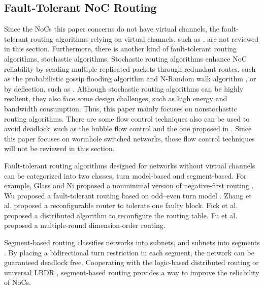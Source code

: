 \subsection{Fault-Tolerant NoC Routing}
Since the NoCs this paper concerns do not have virtual channels, the fault-tolerant routing algorithms relying on virtual channels, such as \cite{boppana1994fault}\cite{ho2004new} \cite{gomez2006routing} \cite{xiang2008practical}, are not reviewed in this section. Furthermore, there is another kind of fault-tolerant routing algorithms, stochastic algorithms. Stochastic routing algorithms enhance NoC reliability by sending multiple replicated packets through redundant routes, such as the probabilistic gossip flooding algorithm \cite{dumitras2003chip} and N-Random walk algorithm \cite{pirretti2004fault}, or by deflection, such as \cite{moscibroda2009case} \cite{tsai2012scalable}. Although stochastic routing algorithms can be highly resilient, they also face some design challenges, such as high energy and bandwidth consumption. Thus, this paper mainly focuses on nonstochastic routing algorithms. There are some flow control techniques also can be used to avoid deadlock, such as the bubble flow control \cite{puente2001adaptive} and the one proposed in \cite{xiang2011efficient}. Since this paper focuses on wormhole switched networks, those flow control techniques will not be reviewed in this section.

Fault-tolerant routing algorithms designed for networks without virtual channels can be categorized into two classes, turn model-based and segment-based. For example, Glass and Ni \cite{glass1993fault} proposed a nonminimal version of negative-first routing \cite{glass1992turn}. Wu proposed a fault-tolerant routing based on odd–even turn model \cite{wu2003fault}. Zhang et al. \cite{zhang2008reconfigurable} proposed a reconfigurable router to tolerate one faulty block. Fick et al. \cite{fick2009highly} \cite{fick2009vicis} proposed a distributed algorithm to reconfigure the routing table. Fu et al. \cite{fu2011new} proposed a multiple-round dimension-order routing.

Segment-based routing classifies networks into subnets, and subnets into segments \cite{mejia2006segment}. By placing a bidirectional turn restriction in each segment, the network can be guaranteed deadlock free. Cooperating with the logic-based distributed routing \cite{flich2008efficient} or universal LBDR \cite{rodrigo2010addressing}, segment-based routing provides a way to improve the reliability of NoCs.

